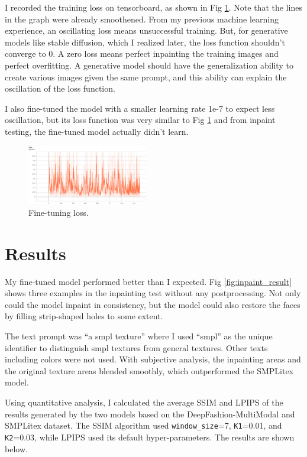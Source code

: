 \documentclass[acmtog]{acmart}
\begin{document}
I recorded the training loss on tensorboard, as shown in Fig \ref{fig:train_loss}. Note that the lines in the graph were already smoothened. From my previous machine learning experience, an oscillating loss means unsuccessful training. But, for generative models like stable diffusion, which I realized later, the loss function shouldn't converge to 0. A zero loss means perfect inpainting the training images and perfect overfitting. A generative model should have the generalization ability to create various images given the same prompt, and this ability can explain the oscillation of the loss function.

I also fine-tuned the model with a smaller learning rate 1e-7 to expect less oscillation, but its loss function was very similar to Fig \ref{fig:train_loss} and from inpaint testing, the fine-tuned model actually didn't learn.

\begin{figure}[h]
  \centering
  \includegraphics[width=0.47\textwidth]{figs/training_loss.png}
  \caption{Fine-tuning loss.}
  \label{fig:train_loss}
\end{figure}

\section{Results}

My fine-tuned model performed better than I expected. Fig \ref{fig:inpaint_result} shows three examples in the inpainting test without any postprocessing. Not only could the model inpaint in consistency, but the model could also restore the faces by filling strip-shaped holes to some extent.

The text prompt was ``a smpl texture'' where I used ``smpl'' as the unique identifier to distinguish smpl textures from general textures. Other texts including colors were not used. With subjective analysis, the inpainting areas and the original texture areas blended smoothly, which outperformed the SMPLitex model.

Using quantitative analysis, I calculated the average SSIM and LPIPS of the results generated by the two models based on the DeepFashion-MultiModal and SMPLitex dataset. The SSIM algorithm used \texttt{window\_size}=7, \texttt{K1}=0.01, and \texttt{K2}=0.03, while LPIPS used its default hyper-parameters. The results are shown below.
\end{document}
